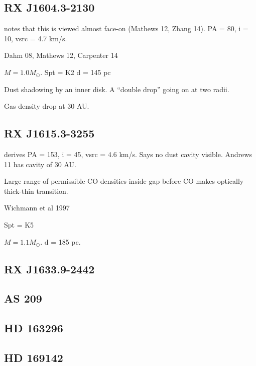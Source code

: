 \documentclass[twocolumn]{aastex6}
\begin{document}
\subsection{RX J1604.3-2130}
\citep{vandermarel15} notes that this is viewed almost face-on (Mathews 12, Zhang 14). PA = 80, i = 10, vsrc = 4.7 km/s.

Dahm 08, Mathews 12, Carpenter 14

$M = 1.0 M_\odot$.
Spt = K2
d = 145 pc

Dust shadowing by an inner disk. A ``double drop'' going on at two radii.

Gas density drop at 30 AU.

\subsection{RX J1615.3-3255}
\citep{vandermarel15} derives PA = 153, i = 45, vsrc = 4.6 km/s. Says no dust cavity visible. Andrews 11 has cavity of 30 AU.

Large range of permissible CO densities inside gap before CO makes optically thick-thin transition.

\citep{andrews11}
Wichmann et al 1997

Spt = K5

$M = 1.1 M_\odot$.
d = 185 pc.

\subsection{RX J1633.9-2442}

\subsection{AS 209}

\subsection{HD 163296}

\subsection{HD 169142}
\end{document}
